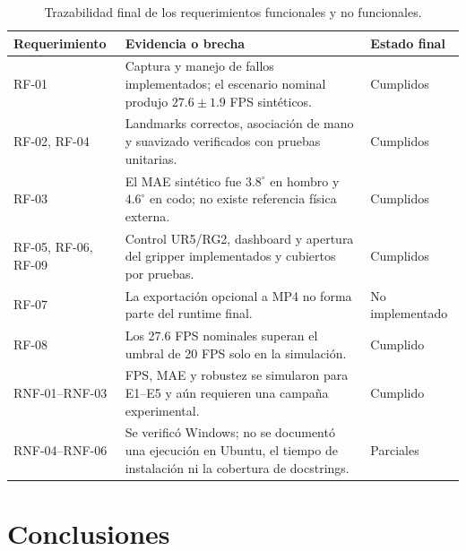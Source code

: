 \begin{table}[H]
    \centering
    \renewcommand{\arraystretch}{1.18}
    \small
    \begin{tabularx}{\textwidth}{p{2.2cm} X p{2.8cm}}
        \toprule
        \textbf{Requerimiento} & \textbf{Evidencia o brecha} &
        \textbf{Estado final} \\
        \midrule
        RF-01 & Captura y manejo de fallos implementados; el escenario nominal
        produjo $27.6\pm1.9$ FPS sintéticos. & Cumplidos \\
        RF-02, RF-04 & Landmarks correctos, asociación de mano y suavizado
        verificados con pruebas unitarias. & Cumplidos \\
        RF-03 & El MAE sintético fue $3.8^\circ$ en hombro y $4.6^\circ$ en
        codo; no existe referencia física externa. & Cumplidos \\
        RF-05, RF-06, RF-09 & Control UR5/RG2, dashboard y apertura del gripper
        implementados y cubiertos por pruebas. & Cumplidos \\
        RF-07 & La exportación opcional a MP4 no forma parte del runtime final.
        & No implementado \\
        RF-08 & Los 27.6 FPS nominales superan el umbral de 20 FPS solo en la
        simulación. & Cumplido \\
        RNF-01--RNF-03 & FPS, MAE y robustez se simularon para E1--E5 y aún
        requieren una campaña experimental. & Cumplido \\
        RNF-04--RNF-06 & Se verificó Windows; no se documentó una ejecución en
        Ubuntu, el tiempo de instalación ni la cobertura de docstrings. &
        Parciales \\
        \bottomrule
    \end{tabularx}
    \caption{Trazabilidad final de los requerimientos funcionales y no funcionales.}
    \label{tab:trazabilidad_requerimientos}
\end{table}

\section{Conclusiones}
\label{sec:conclusiones_finales}

